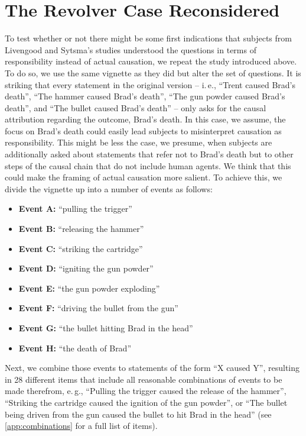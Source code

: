 \documentclass[12pt]{scrartcl}
\begin{document}
\section{The Revolver Case Reconsidered}
\label{sec:revolver_case_reconsidered}
To test whether or not there might be some first indications that subjects from Livengood and Sytsma's studies understood the questions in terms of responsibility instead of actual causation, we repeat the study introduced above. To do so, we use the same vignette as they did but alter the set of questions. It is striking that every statement in the original version -- i.\,e., \enquote{Trent caused Brad's death}, \enquote{The hammer caused Brad's death}, \enquote{The gun powder caused Brad's death}, and \enquote{The bullet caused Brad's death} -- only asks for the causal attribution regarding the outcome, Brad's death. In this case, we assume, the focus on Brad's death could easily lead subjects to misinterpret causation as responsibility. This might be less the case, we presume, when subjects are additionally asked about statements that refer not to Brad's death but to other steps of the causal chain that do not include human agents. We think that this could make the framing of actual causation more salient. To achieve this, we divide the vignette up into a number of events as follows:
%
\begin{itemize}
   \item\textbf{\textsf{Event A:}} \enquote{pulling the trigger}
   \item\textbf{\textsf{Event B:}} \enquote{releasing the hammer}
   \item\textbf{\textsf{Event C:}} \enquote{striking the cartridge}
   \item\textbf{\textsf{Event D:}} \enquote{igniting the gun powder}
   \item\textbf{\textsf{Event E:}} \enquote{the gun powder exploding}
   \item\textbf{\textsf{Event F:}} \enquote{driving the bullet from the gun}
   \item\textbf{\textsf{Event G:}} \enquote{the bullet hitting Brad in the head}
   \item\textbf{\textsf{Event H:}} \enquote{the death of Brad}
\end{itemize}
%
Next, we combine those events to statements of the form \enquote{X caused Y}, resulting in 28 different items that include all reasonable combinations of events to be made therefrom, e.\,g., \enquote{Pulling the trigger caused the release of the hammer}, \enquote{Striking the cartridge caused the ignition of the gun powder}, or \enquote{The bullet being driven from the gun caused the bullet to hit Brad in the head} (see \autoref{app:combinations} for a full list of items).
\end{document}
